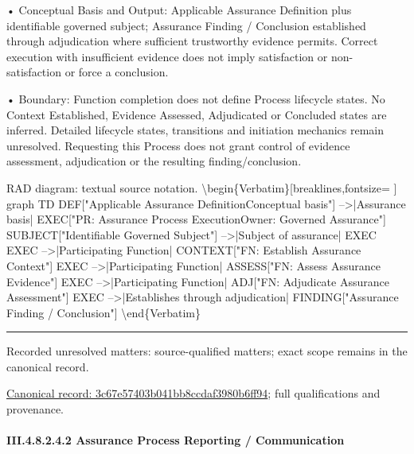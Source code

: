 •
Conceptual Basis and Output: Applicable Assurance Definition plus identifiable governed subject; Assurance Finding / Conclusion established through adjudication where sufficient trustworthy evidence permits. Correct execution with insufficient evidence does not imply satisfaction or non-satisfaction or force a conclusion.



•
Boundary: Function completion does not define Process lifecycle states. No Context Established, Evidence Assessed, Adjudicated or Concluded states are inferred. Detailed lifecycle states, transitions and initiation mechanics remain unresolved. Requesting this Process does not grant control of evidence assessment, adjudication or the resulting finding/conclusion.



RAD diagram: textual source notation.
\textbackslash{}begin\{Verbatim\}[breaklines,fontsize=
]
graph TD
    DEF["Applicable Assurance Definition\newline{}Conceptual basis"] -->|Assurance basis| EXEC["PR: Assurance Process Execution\newline{}Owner: Governed Assurance"]
    SUBJECT["Identifiable Governed Subject"] -->|Subject of assurance| EXEC
    EXEC -->|Participating Function| CONTEXT["FN: Establish Assurance Context"]
    EXEC -->|Participating Function| ASSESS["FN: Assess Assurance Evidence"]
    EXEC -->|Participating Function| ADJ["FN: Adjudicate Assurance Assessment"]
    EXEC -->|Establishes through adjudication| FINDING["Assurance Finding / Conclusion"]
\textbackslash{}end\{Verbatim\}



\medskip\hrule\medskip

{\small Recorded unresolved matters: source-qualified matters; exact scope remains in the canonical record.}\par
{\footnotesize \href{../../../../../../../continuum/business/business-process/3c67e57403b041bb8ccdaf3980b6ff94.md}{Canonical record: 3c67e57403b041bb8ccdaf3980b6ff94}; full qualifications and provenance.}\par
\paragraph*{III.4.8.2.4.2 Assurance Process Reporting / Communication}
\label{navigation:III.4.8.2.4.2}

